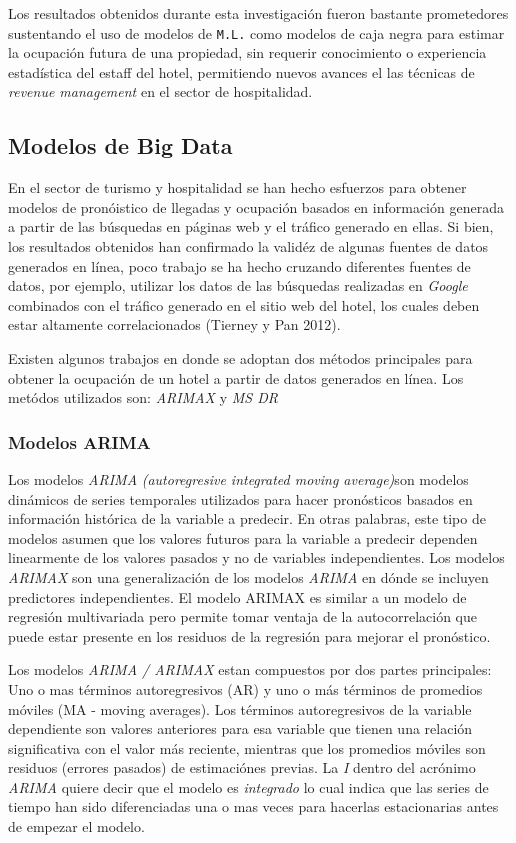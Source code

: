 {Los resultados obtenidos durante esta investigación fueron bastante prometedores sustentando el uso de modelos de \texttt{M.L.} como modelos de caja negra para estimar la ocupación futura de una propiedad, sin requerir conocimiento o experiencia estadística del estaff del hotel, permitiendo nuevos avances el las técnicas de \emph{revenue management} en el sector de hospitalidad.

\subsection*{Modelos de Big Data}

En el sector de turismo y hospitalidad se han hecho esfuerzos para obtener modelos de pronóistico de llegadas y ocupación basados en información generada a partir de las búsquedas en páginas web y el tráfico generado en ellas. Si bien, los resultados obtenidos han confirmado la validéz de algunas fuentes de datos generados en línea, poco trabajo se ha hecho cruzando diferentes fuentes de datos, por ejemplo, utilizar los datos de las búsquedas realizadas en \emph{Google} combinados con el tráfico generado en el sitio web del hotel, los cuales deben estar altamente correlacionados (Tierney y Pan 2012).

Existen algunos trabajos en donde se adoptan dos métodos principales para obtener la ocupación de un hotel a partir de datos generados en línea. Los metódos utilizados son: \emph{ARIMAX} y \emph{MS DR}

\subsubsection*{Modelos ARIMA}

Los modelos \emph{ARIMA} \emph{(autoregresive integrated moving average)}son modelos dinámicos de series temporales utilizados para hacer pronósticos basados en información histórica de la variable a predecir. En otras palabras, este tipo de modelos asumen que los valores futuros para la variable a predecir dependen linearmente de los valores pasados y no de variables independientes. Los modelos \emph{ARIMAX} son una generalización de los modelos \emph{ARIMA} en dónde se incluyen predictores independientes. El modelo ARIMAX es similar a un modelo de regresión multivariada pero permite tomar ventaja de la autocorrelación que puede estar presente en los residuos de la regresión para mejorar el pronóstico. 

Los modelos \emph{ARIMA / ARIMAX} estan compuestos por dos partes principales: Uno o mas términos autoregresivos (AR) y uno o más términos de promedios móviles (MA - moving averages). Los términos autoregresivos de la variable dependiente son valores anteriores para esa variable que tienen una relación significativa con el valor más reciente, mientras que los promedios móviles son residuos (errores pasados) de estimaciónes previas. La \emph{I} dentro del acrónimo \emph{ARIMA} quiere decir que el modelo es \emph{integrado} lo cual indica que las series de tiempo han sido diferenciadas una o mas veces para hacerlas estacionarias antes de empezar el modelo.
}
